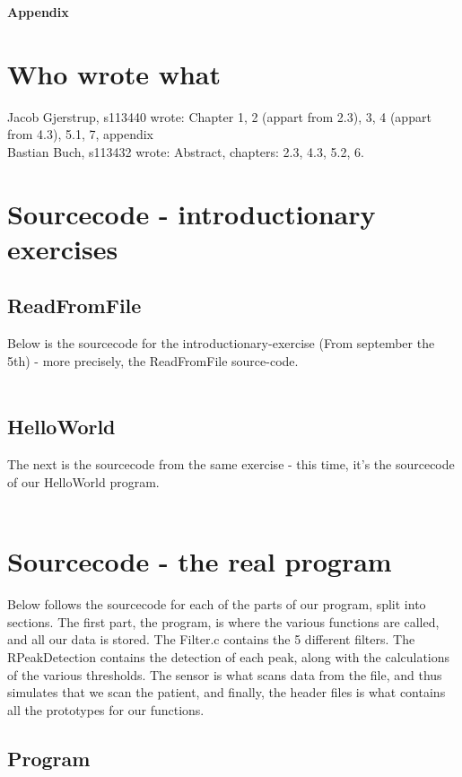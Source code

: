 \documentclass[12pt,a4paper]{article}
\begin{document}
\newpage	
	\begin{Large}
		\textbf{Appendix}
	\end{Large}
	\appendix

\section{Who wrote what}
Jacob Gjerstrup, s113440 wrote: Chapter 1, 2 (appart from 2.3), 3, 4 (appart from 4.3), 5.1, 7, appendix\\
Bastian Buch, s113432 wrote: Abstract, chapters: 2.3, 4.3, 5.2, 6.\\
	
\section{Sourcecode - introductionary exercises}
\subsection{ReadFromFile}
	Below is the sourcecode for the introductionary-exercise (From september the 5th) - more precisely, the ReadFromFile source-code.\\
	\\
	

\subsection{HelloWorld}
	The next is the sourcecode from the same exercise - this time, it's the sourcecode of our HelloWorld program.\\
	\\
	
	
\section{Sourcecode - the real program}
	Below follows the sourcecode for each of the parts of our program, split into sections. The first part, the program, is where the various functions are called, and all our data is stored. The Filter.c contains the 5 different filters. The RPeakDetection contains the detection of each peak, along with the calculations of the various thresholds. The sensor is what scans data from the file, and thus simulates that we scan the patient, and finally, the header files is what contains all the prototypes for our functions.
\subsection{Program}
		
\end{document}
